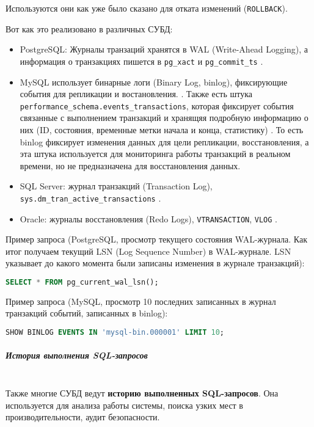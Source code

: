 Используются они как уже было сказано для отката изменений (\texttt{ROLLBACK}).

Вот как это реализовано в различных СУБД:

\begin{itemize}
    \item PostgreSQL: Журналы транзаций хранятся в WAL (Write-Ahead Logging), а информация о транзакциях пишется в \texttt{pg\_xact} и \texttt{pg\_commit\_ts} \autocite{PostgreSQLdocc28}.
    \item MySQL использует бинарные логи (Binary Log, binlog), фиксирующие события для репликации и востановления. \autocite{Mysqldoc3}. Также есть штука \texttt{performance\_schema.events\_transactions}, которая фиксирует события связанные с выполнением транзакций и хранящяя подробную информацию о них (ID, состояния, временные метки начала и конца, статистику) \autocite{Mysqldoc2}. То есть binlog фиксирует изменения данных для цели репликации, восстановления, а эта штука используется для мониторинга работы транзакций в реальном времени, но не предназначена для восстановления данных. 
    \item SQL Server: журнал транзакций (Transaction Log), \texttt{sys.dm\_tran\_active\_transactions} \autocite{MicrosoftLearnSQLserverTransLog}.
    \item Oracle: журналы восстановления (Redo Logs), \texttt{V\textdollar TRANSACTION}, \texttt{V\textdollar LOG} \autocite{OracleRedoLog}.
\end{itemize}

Пример запроса (PostgreSQL, просмотр текущего состояния WAL-журнала. Как итог получаем текущий LSN (Log Sequence Number) в WAL-журнале. LSN указывает до какого момента были записаны изменения в журнале транзакций):
\begin{lstlisting}[language=SQL]
    SELECT * FROM pg_current_wal_lsn();                
\end{lstlisting}

Пример запроса (MySQL, просмотр 10 последних записанных в журнал транзакций событий, записанных в binlog):
\begin{lstlisting}[language=SQL]
    SHOW BINLOG EVENTS IN 'mysql-bin.000001' LIMIT 10;           
\end{lstlisting}

\subparagraph{История выполнения SQL-запросов} ~\\

Также многие СУБД ведут \textbf{историю выполненных SQL-запросов}. Она используется для анализа работы системы, поиска узких мест в производительности, аудит безопасности. 

